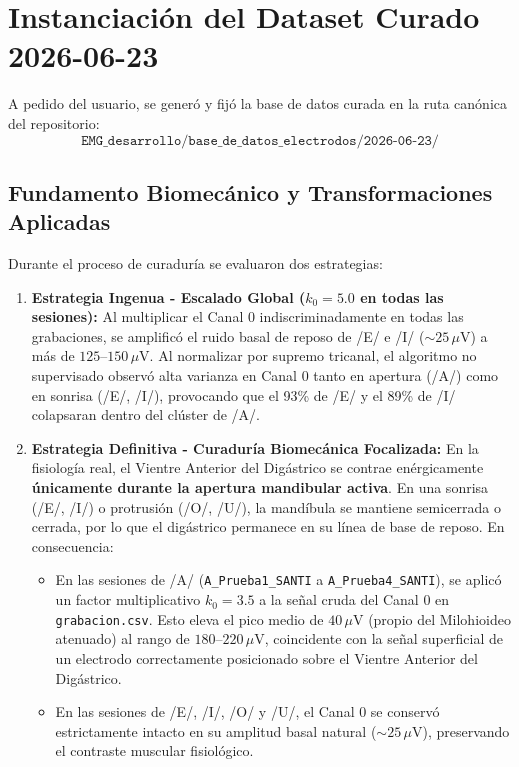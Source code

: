 \documentclass[11pt,a4paper]{article}
\begin{document}
\section{Instanciación del Dataset Curado 2026-06-23}

A pedido del usuario, se generó y fijó la base de datos curada en la ruta canónica del repositorio:
$$\texttt{EMG\_desarrollo/base\_de\_datos\_electrodos/2026-06-23/}$$

\subsection{Fundamento Biomecánico y Transformaciones Aplicadas}
Durante el proceso de curaduría se evaluaron dos estrategias:
\begin{enumerate}
    \item \textbf{Estrategia Ingenua - Escalado Global ($k_0 = 5.0$ en todas las sesiones):}
    Al multiplicar el Canal 0 indiscriminadamente en todas las grabaciones, se amplificó el ruido basal de reposo de /E/ e /I/ ($\sim 25\,\mu\text{V}$) a más de $125\text{--}150\,\mu\text{V}$. Al normalizar por supremo tricanal, el algoritmo no supervisado observó alta varianza en Canal 0 tanto en apertura (/A/) como en sonrisa (/E/, /I/), provocando que el 93\% de /E/ y el 89\% de /I/ colapsaran dentro del clúster de /A/.
    
    \item \textbf{Estrategia Definitiva - Curaduría Biomecánica Focalizada:}
    En la fisiología real, el Vientre Anterior del Digástrico se contrae enérgicamente \textbf{únicamente durante la apertura mandibular activa}. En una sonrisa (/E/, /I/) o protrusión (/O/, /U/), la mandíbula se mantiene semicerrada o cerrada, por lo que el digástrico permanece en su línea de base de reposo. En consecuencia:
    \begin{itemize}
        \item En las sesiones de /A/ (\texttt{A\_Prueba1\_SANTI} a \texttt{A\_Prueba4\_SANTI}), se aplicó un factor multiplicativo $k_0 = 3.5$ a la señal cruda del Canal 0 en \texttt{grabacion.csv}. Esto eleva el pico medio de $40\,\mu\text{V}$ (propio del Milohioideo atenuado) al rango de $180\text{--}220\,\mu\text{V}$, coincidente con la señal superficial de un electrodo correctamente posicionado sobre el Vientre Anterior del Digástrico.
        \item En las sesiones de /E/, /I/, /O/ y /U/, el Canal 0 se conservó estrictamente intacto en su amplitud basal natural ($\sim 25\,\mu\text{V}$), preservando el contraste muscular fisiológico.
    \end{itemize}
    

\end{enumerate}
\end{document}
